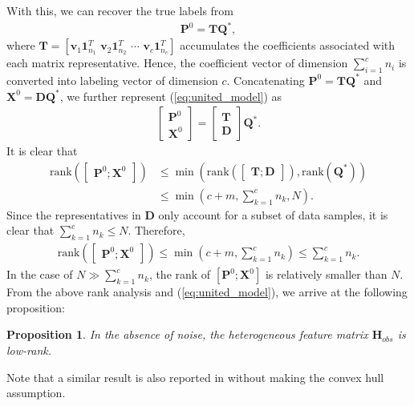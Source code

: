\documentclass[10pt,journal,compsoc]{IEEEtran}
\begin{document}
With this, we can recover the true labels from
\begin{equation}
\begin{aligned}
\mathbf{P}^0 = \mathbf{T}\mathbf{Q}^*,
\label{eq:P_recover}
\end{aligned}
\end{equation}
where $\mathbf{T} = [\mathbf{v}_1\mathbf{1}^T_{n_1} \,\, \mathbf{v}_2 \mathbf{1}^T_{n_2} \,\, \cdots \,\, \mathbf{v}_c \mathbf{1}^T_{n_c} ]$ accumulates the coefficients associated with each matrix representative.
Hence, the coefficient vector of dimension $\sum_{i=1}^c n_i$ is converted into labeling vector of dimension $c$. Concatenating $\mathbf{P}^0 = \mathbf{T}\mathbf{Q}^*$ and $\mathbf{X}^0 = \mathbf{D}\mathbf{Q}^*$, we further represent (\ref{eq:united_model}) as
\begin{equation}
\begin{aligned}
\begin{bmatrix}
\mathbf{P}^0 \\
\mathbf{X}^0
\end{bmatrix}
=
\begin{bmatrix}
\mathbf{T} \\
\mathbf{D}
\end{bmatrix}\mathbf{Q}^*.
\label{eq:px_model}
\end{aligned}
\end{equation}
It is clear that
\begin{equation}
\begin{aligned}
\mathrm{rank}(
\begin{bmatrix}
\mathbf{P}^0 ;
\mathbf{X}^0
\end{bmatrix})
& \leq \min \left(\mathrm{rank}(\begin{bmatrix}
\mathbf{T} ;
\mathbf{D}
\end{bmatrix}),
\mathrm{rank}(\mathbf{Q}^*)\right)
\\
& \leq \min \left(c + m , \sum_{k=1}^c n_k, N\right).
\end{aligned}
\end{equation}
Since the representatives in $\mathbf{D}$ only account for a subset of data samples, it is clear that $\sum_{k=1}^c n_k \leq N$. Therefore,
\begin{equation}
\begin{aligned}
\mathrm{rank}(
\begin{bmatrix}
\mathbf{P}^0 ;
\mathbf{X}^0
\end{bmatrix})
\leq \min \left(c + m , \sum_{k=1}^c n_k\right) \leq \sum_{k=1}^c n_k.
\end{aligned}
\end{equation}
In the case of $N \gg  \sum_{k=1}^c n_k$, the rank of $[\mathbf{P}^0; \mathbf{X}^0]$ is relatively smaller than $N$. From the above rank analysis and (\ref{eq:united_model}), we arrive at the following proposition:
\newtheorem{prop}{Proposition}
\begin{prop}
In the absence of noise, the heterogeneous feature matrix $\mathbf{H}_{obs}$ is low-rank.
\label{th:optimalPD}
\end{prop}
Note that a similar result is also reported in \cite{Cabral2014} without making the convex hull assumption.
\end{document}
